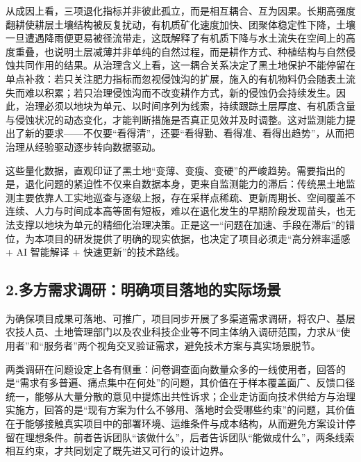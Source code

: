 从成因上看，三项退化指标并非彼此孤立，而是相互耦合、互为因果。长期高强度翻耕使耕层土壤结构被反复扰动，有机质矿化速度加快、团聚体稳定性下降，土壤一旦遭遇降雨便更易被径流带走，这既解释了有机质下降与水土流失在空间上的高度重叠，也说明土层减薄并非单纯的自然过程，而是耕作方式、种植结构与自然侵蚀共同作用的结果。从治理含义上看，这一耦合关系决定了黑土地保护不能停留在单点补救：若只关注肥力指标而忽视侵蚀沟的扩展，施入的有机物料仍会随表土流失而难以积累；若只治理侵蚀沟而不改变耕作方式，新的侵蚀仍会持续发生。因此，治理必须以地块为单元、以时间序列为线索，持续跟踪土层厚度、有机质含量与侵蚀状况的动态变化，才能判断措施是否真正见效并及时调整。这对监测能力提出了新的要求——不仅要“看得清”，还要“看得勤、看得准、看得出趋势”，从而把治理从经验驱动逐步转向数据驱动。

这些量化数据，直观印证了黑土地“变薄、变瘦、变硬”的严峻趋势。需要指出的是，退化问题的紧迫性不仅来自数据本身，更来自监测能力的滞后：传统黑土地监测主要依靠人工实地巡查与逐级上报，存在采样点稀疏、更新周期长、空间覆盖不连续、人力与时间成本高等固有短板，难以在退化发生的早期阶段发现苗头，也无法支撑以地块为单元的精细化治理决策。正是这一“问题在加速、手段在滞后”的错位，为本项目的研发提供了明确的现实依据，也决定了项目必须走“高分辨率遥感 + AI 智能解译 + 快速更新”的技术路线。

\subsection{2.多方需求调研：明确项目落地的实际场景}

为确保项目成果可落地、可推广，项目同步开展了多渠道需求调研，将农户、基层农技人员、土地管理部门以及农业科技企业等不同主体纳入调研范围，力求从“使用者”和“服务者”两个视角交叉验证需求，避免技术方案与真实场景脱节。

两类调研在问题设定上各有侧重：问卷调查面向数量众多的一线使用者，回答的是“需求有多普遍、痛点集中在何处”的问题，其价值在于样本覆盖面广、反馈口径统一，能够从大量分散的意见中提炼出共性诉求；企业走访面向技术供给方与治理实施方，回答的是“现有方案为什么不够用、落地时会受哪些约束”的问题，其价值在于能够接触真实项目中的部署环境、运维条件与成本结构，从而避免方案设计停留在理想条件。前者告诉团队“该做什么”，后者告诉团队“能做成什么”，两条线索相互约束，才共同划定了既先进又可行的设计边界。

